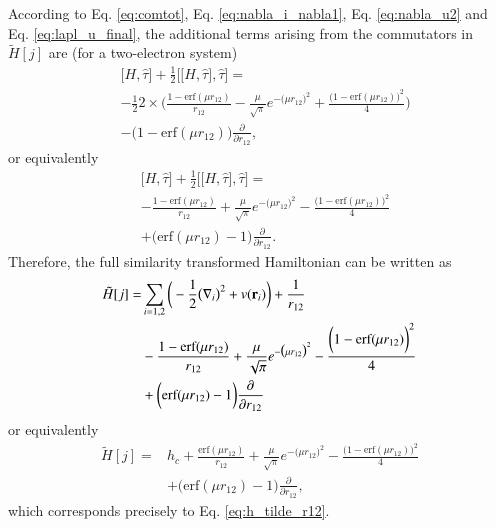\documentclass[aip,jcp,reprint,noshowkeys,superscriptaddress]{revtex4-1}
\newcommand{\deriv}[3]{\frac{\partial^{#3} #1}{\partial {#2}^{#3}}}
\newcommand{\br}[0]{{\bf {r}}}
\begin{document}
According to Eq. \eqref{eq:comtot}, Eq. \eqref{eq:nabla_i_nabla1}, Eq. \eqref{eq:nabla_u2} and Eq. \eqref{eq:lapl_u_final}, the additional terms arising from the commutators in $\tilde{H}[j]$ are (for a two-electron system) 
\begin{equation}
 \begin{aligned}
 \label{eq:comtot2}
 & \big[ H,\hat{\tau} \big] + \frac{1}{2} \bigg[ \big[H,\hat{\tau}\big],\hat{\tau}\bigg] =  \\
 & -\frac{1}{2} 2 \times \bigg( \frac{1 - \text{erf}(\mu r_{12})}{r_{12}} - \frac{\mu}{\sqrt{\pi}} e^{-\big(\mu r_{12} \big)^2} + \frac{\bigg(1 - \text{erf}(\mu r_{12}) \bigg)^2}{4}  \bigg) \\
   &- \bigg( 1 - \text{erf}(\mu r_{12})\bigg) \deriv{}{r_{12}}{},
 \end{aligned}
\end{equation}
or equivalently
\begin{equation}
 \begin{aligned}
 \label{eq:comtot2}
 & \big[ H,\hat{\tau} \big] + \frac{1}{2} \bigg[ \big[H,\hat{\tau}\big],\hat{\tau}\bigg] =  \\
 & -\frac{1 - \text{erf}(\mu r_{12})}{r_{12}} + \frac{\mu}{\sqrt{\pi}} e^{-\big(\mu r_{12} \big)^2} - \frac{\bigg(1 - \text{erf}(\mu r_{12}) \bigg)^2}{4} \\
   & + \bigg( \text{erf}(\mu r_{12}) - 1\bigg) \deriv{}{r_{12}}{}.
 \end{aligned}
\end{equation}
Therefore, the full similarity transformed Hamiltonian can be written as
\begin{equation}
  \begin{aligned}
   \tilde{H}[j] = & \sum_{i = 1,2} \bigg( -\frac{1}{2} \big(\nabla_i\big)^2 + v(\br{}_i)  \bigg) + \frac{1}{r_{12}} \\
&   -\frac{1 - \text{erf}(\mu r_{12})}{r_{12}} + \frac{\mu}{\sqrt{\pi}} e^{-\big(\mu r_{12} \big)^2} - \frac{\bigg(1 -     \text{erf}(\mu r_{12}) \bigg)^2}{4} \\
& + \bigg( \text{erf}(\mu r_{12}) - 1\bigg) \deriv{}{r_{12}}{}
  \end{aligned}
\end{equation}
or equivalently 
\begin{equation}
  \begin{aligned}
   \tilde{H}[j] = & h_c + \frac{\text{erf}(\mu r_{12})}{r_{12}} + \frac{\mu}{\sqrt{\pi}} e^{-\big(\mu r_{12} \big)^2} - \frac{\bigg(1 -     \text{erf}(\mu r_{12}) \bigg)^2}{4} \\
& + \bigg( \text{erf}(\mu r_{12}) - 1\bigg) \deriv{}{r_{12}}{},
  \end{aligned}
\end{equation}
which corresponds precisely to Eq. \eqref{eq:h_tilde_r12}. 
\end{document}

